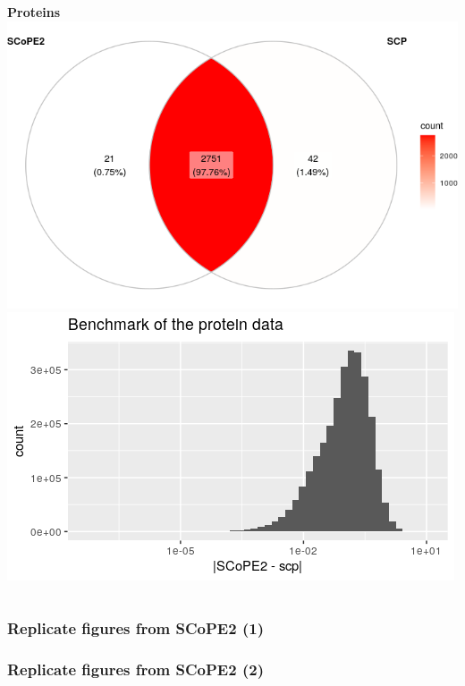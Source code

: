 \documentclass{beamer}
\newcommand{\frametitlesection}[1]{\frametitle{\centering #1 \footnotesize \hspace{0pt plus 1 filll} \insertsection}}
\begin{document}
\begin{frame}
\begin{columns}
        \begin{column}{0.5\textwidth}
            \textbf{Proteins} \\
            \includegraphics[width=\linewidth]{figs/Benchmark_prot_venn.png} \\
            \includegraphics[width=\linewidth]{figs/Benchmark_prot_err.png}
        \end{column}
    \end{columns}
    
\end{frame}

\begin{frame}
    \frametitlesection{Replicate figures from SCoPE2 (1)}
    
    
\end{frame}

\begin{frame}
    \frametitlesection{Replicate figures from SCoPE2 (2)}
    
\end{frame}
\end{document}
